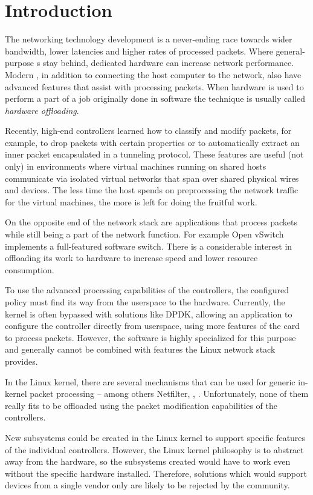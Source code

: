 \chapter{Introduction}

The networking technology development is a never-ending race towards wider bandwidth,
lower latencies and higher rates of processed packets. Where general-purpose
s stay behind, dedicated hardware can increase network performance.
Modern , in addition to connecting the host
computer to the network, also have advanced features that assist with
processing packets. When hardware is used to perform a part of
a job originally done in software the technique is usually called \emph{hardware offloading}.

Recently, high-end controllers learned how to classify and modify packets, for
example, to drop packets with certain properties or to automatically extract an inner
packet encapsulated in a tunneling protocol. These features are useful (not
only) in environments where virtual machines running on shared hosts communicate via isolated
virtual networks that span over shared physical wires and devices. The less time the
host spends on preprocessing the network traffic for the virtual machines, the more
is left for doing the fruitful work.

On the opposite end of the network stack are applications that process
packets while still being a part of the network function. For example
Open vSwitch implements a full-featured software switch. There is
a considerable interest in offloading its work to hardware to increase
speed and lower resource consumption.

To use the advanced processing capabilities of the controllers, the configured
policy must find its way from the userspace to the hardware. Currently, the
kernel is often bypassed with solutions like \acrfull{DPDK}, allowing an
application to configure the controller directly from userspace, using more
features of the card to process packets. However, the software is
highly specialized for this purpose and generally cannot be combined with
features the Linux network stack provides.

In the Linux kernel, there are several mechanisms that can be used for generic
in-kernel packet processing -- among others Netfilter, , .
Unfortunately, none of them really fits to be offloaded using the packet
modification capabilities of the controllers.

New subsystems could be created in the Linux kernel to support specific features of
the individual controllers. However, the Linux kernel philosophy is to abstract away from the
hardware, so the subsystems created would have to work even without the
specific hardware installed. Therefore, solutions which would support devices
from a single vendor only are likely to be rejected by the community.

